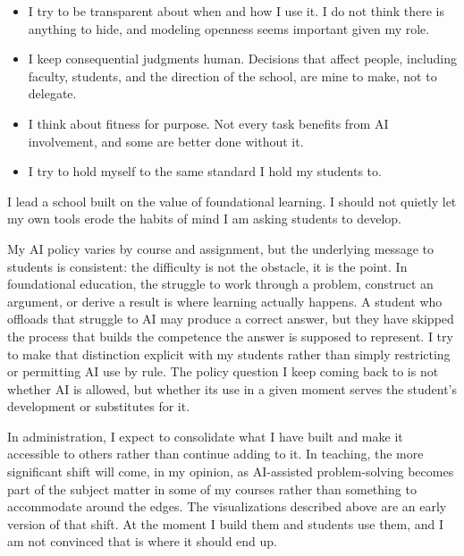 \documentclass[10pt]{article}
\begin{document}
\begin{itemize}[leftmargin=1.4em, itemsep=0.35em, topsep=0.3em, parsep=0pt]
  \item I try to be transparent about when and how I use it. I do not think there is anything to
        hide, and modeling openness seems important given my role.
  \item I keep consequential judgments human. Decisions that affect people, including faculty,
        students, and the direction of the school, are mine to make, not to delegate.
  \item I think about fitness for purpose. Not every task benefits from AI involvement, and some
        are better done without it.
  \item I try to hold myself to the same standard I hold my students to.
\end{itemize}

I lead a school built on the value of foundational learning. I should not quietly let my own
tools erode the habits of mind I am asking students to develop.


My AI policy varies by course and assignment, but the underlying message to students is
consistent: the difficulty is not the obstacle, it is the point. In foundational education, the
struggle to work through a problem, construct an argument, or derive a result is where learning
actually happens. A student who offloads that struggle to AI may produce a correct answer, but
they have skipped the process that builds the competence the answer is supposed to represent. I
try to make that distinction explicit with my students rather than simply restricting or
permitting AI use by rule. The policy question I keep coming back to is not whether AI is
allowed, but whether its use in a given moment serves the student's development or substitutes
for it.


In administration, I expect to consolidate what I have built and make it accessible to others
rather than continue adding to it. In teaching, the more significant shift will come, in my
opinion, as AI-assisted problem-solving becomes part of the subject matter in some of my
courses rather than something to accommodate around the edges. The visualizations described
above are an early version of that shift. At the moment I build them and students use them, and
I am not convinced that is where it should end up.
\end{document}
